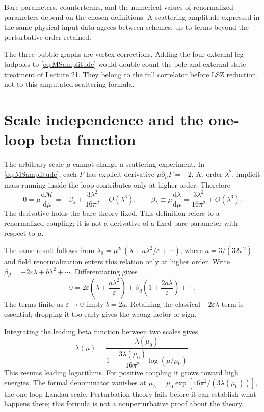 \documentclass[11pt]{article}
\newcommand{\dd}{\mathrm d}
\newcommand{\eps}{\varepsilon}
\newcommand{\module}[1]{\clearpage\section{#1}}
\begin{document}
\begin{keyidea}
Bare parameters, counterterms, and the numerical values of renormalized
parameters depend on the chosen definitions. A scattering amplitude
expressed in the same physical input data agrees between schemes,
up to terms beyond the perturbative order retained.
\end{keyidea}
The three bubble graphs are vertex corrections. Adding the four
external-leg tadpoles to \eqref{eq:MSamplitude} would double count the
pole and external-state treatment of Lecture 21. They belong to the
full correlator before LSZ reduction, not to this amputated scattering
formula.

\module{Scale independence and the one-loop beta function}
The arbitrary scale \(\mu\) cannot change a scattering experiment.
In \eqref{eq:MSamplitude}, each \(F\) has explicit derivative
\(\mu\partial_\mu F=-2\). At order \(\lambda^2\), implicit mass
running inside the loop contributes only at higher order. Therefore
\begin{equation}
 0=\mu\frac{\dd\mathcal M}{\dd\mu}
 =-\beta_\lambda+\frac{3\lambda^2}{16\pi^2}+O(\lambda^3),
 \qquad
 \boxed{\beta_\lambda\equiv\mu\frac{\dd\lambda}{\dd\mu}
 =\frac{3\lambda^2}{16\pi^2}+O(\lambda^3).}        \label{eq:beta}
\end{equation}
The derivative holds the bare theory fixed. This definition refers
to a renormalized coupling; it is not a derivative of a fixed bare
parameter with respect to \(\mu\).

The same result follows from
\(\lambda_0=\mu^{2\eps}(\lambda+a\lambda^2/\bar\eps+\cdots)\),
where \(a=3/(32\pi^2)\) and field renormalization enters this relation
only at higher order. Write
\(\beta_d=-2\eps\lambda+b\lambda^2+\cdots\). Differentiating gives
\begin{equation}
 0=2\eps\left(\lambda+\frac{a\lambda^2}{\bar\eps}\right)
 +\beta_d\left(1+\frac{2a\lambda}{\bar\eps}\right)+\cdots.
\end{equation}
The terms finite as \(\eps\to0\) imply \(b=2a\). Retaining the
classical \(-2\eps\lambda\) term is essential; dropping it too early
gives the wrong factor or sign.

Integrating the leading beta function between two scales gives
\begin{equation}
 \lambda(\mu)=\frac{\lambda(\mu_0)}
 {1-\dfrac{3\lambda(\mu_0)}{16\pi^2}\log(\mu/\mu_0)}.
 \label{eq:running}
\end{equation}
This resums leading logarithms. For positive coupling it grows toward
high energies. The formal denominator vanishes at
\(\mu_L=\mu_0\exp[16\pi^2/(3\lambda(\mu_0))]\), the one-loop Landau
scale. Perturbation theory fails before it can establish what happens
there; this formula is not a nonperturbative proof about the theory.
\end{document}
